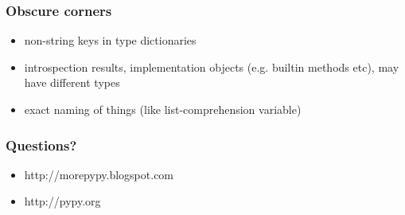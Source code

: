 \documentclass[utf8x, 14pt]{beamer}
\begin{document}
\begin{frame}
  \frametitle{Obscure corners}
  \begin{itemize}
    \item non-string keys in type dictionaries
    \item introspection results, implementation objects (e.g. builtin methods
      etc), may have different types
    \item exact naming of things (like list-comprehension variable)
  \end{itemize}
\end{frame}

\begin{frame}
  \frametitle{Questions?}
  \begin{itemize}
    \item http://morepypy.blogspot.com
    \item http://pypy.org
  \end{itemize}
\end{frame}
\end{document}
